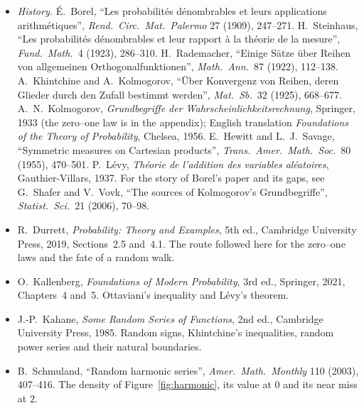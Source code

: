 \begin{itemize}
\item \emph{History.} \'E.~Borel, ``Les probabilit\'es d\'enombrables et leurs applications arithm\'etiques'', \emph{Rend.\ Circ.\ Mat.\ Palermo} 27
(1909), 247--271. H.~Steinhaus, ``Les probabilit\'es d\'enombrables et leur rapport \`a la th\'eorie de la mesure'', \emph{Fund.\ Math.}\ 4 (1923),
286--310. H.~Rademacher, ``Einige S\"atze \"uber Reihen von allgemeinen Orthogonalfunktionen'', \emph{Math.\ Ann.}\ 87 (1922), 112--138.
A.~Khintchine and A.~Kolmogorov, ``\"Uber Konvergenz von Reihen, deren Glieder durch den Zufall bestimmt werden'', \emph{Mat.\ Sb.}\ 32 (1925), 668--677.
A.~N.~Kolmogorov, \emph{Grundbegriffe der Wahrscheinlichkeitsrechnung}, Springer, 1933 (the zero--one law is in the appendix); English translation
\emph{Foundations of the Theory of Probability}, Chelsea, 1956. E.~Hewitt and L.~J.~Savage, ``Symmetric measures on Cartesian products'',
\emph{Trans.\ Amer.\ Math.\ Soc.}\ 80 (1955), 470--501. P.~L\'evy, \emph{Th\'eorie de l'addition des variables al\'eatoires}, Gauthier-Villars, 1937.
For the story of Borel's paper and its gaps, see G.~Shafer and V.~Vovk, ``The sources of Kolmogorov's Grundbegriffe'', \emph{Statist.\ Sci.}\ 21 (2006), 70--98.
\item R.~Durrett, \emph{Probability: Theory and Examples}, 5th ed., Cambridge University Press, 2019, Sections~2.5 and~4.1. The route followed here for
the zero--one laws and the fate of a random walk.
\item O.~Kallenberg, \emph{Foundations of Modern Probability}, 3rd ed., Springer, 2021, Chapters~4 and~5. Ottaviani's inequality and L\'evy's theorem.
\item J.-P.~Kahane, \emph{Some Random Series of Functions}, 2nd ed., Cambridge University Press, 1985. Random signs, Khintchine's inequalities,
random power series and their natural boundaries.
\item B.~Schmuland, ``Random harmonic series'', \emph{Amer.\ Math.\ Monthly} 110 (2003), 407--416. The density of Figure~\ref{fig:harmonic}, its value
at $0$ and its near miss at $2$.
\end{itemize}
